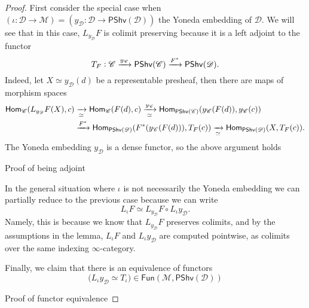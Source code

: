 \documentclass[../text]{subfiles}
\begin{document}
\begin{proof}
    First consider the special case when $(\iota: \mathscr{D} \xrightarrow{} \mathscr{M}) = (y_{\mathscr{D}}: \mathscr{D} \xrightarrow{} \mathsf{PShv}(\mathscr{D}))$ the Yoneda embedding of $\mathscr{D}$. We will see that in this case, $L_{y_{\mathscr{D}}} F$ is colimit preserving because it is a left adjoint to the functor
    \begin{equation}
        T_F: \mathscr{C} \xrightarrow{y_{\mathscr{C}}} \mathsf{PShv} (\mathscr{C}) \xrightarrow{F^*} \mathsf{PShv} (\mathscr{D}).
    \end{equation}
    Indeed, let $X \simeq y_{\mathscr{D}} (d)$ be a representable presheaf, then there are maps of morphism spaces
    \begin{align}
        \mathsf{Hom}_{\mathscr{C}} (L_{y_{\mathscr{D}}} F (X), c) &\xrightarrow[\simeq]{} \mathsf{Hom}_{\mathscr{C}} (F (d), c) \xrightarrow[\simeq]{y_{\mathscr{C}}} \mathsf{Hom}_{\mathsf{PShv}(\mathscr{C})} (y_{\mathscr{C}}(F(d)), y_{\mathscr{C}}(c))\notag\\ &\xrightarrow{F^*} \mathsf{Hom}_{\mathsf{PShv}(\mathscr{D})} (F^*(y_{\mathscr{C}}(F(d))), T_F(c)) \xrightarrow[\simeq]{} \mathsf{Hom}_{\mathsf{PShv}(\mathscr{D})} (X, T_F(c)).
    \end{align}
    The Yoneda embedding $y_{\mathscr{D}}$ is a dense functor, so the above argument holds  
    
    {\color{red} Proof of being adjoint}

    In the general situation where $\iota$ is not necessarily the Yoneda embedding we can partially reduce to the previous case because we can write
    \begin{equation}
        L_{\iota} F \simeq L_{y_{\mathscr{D}}}F \circ L_{\iota} y_{\mathscr{D}}.
    \end{equation}
    Namely, this is because we know that $L_{y_{\mathscr{D}}} F$ preserves colimits, and by the assumptions in the lemma, $L_{\iota} F$ and $L_{\iota} y_{\mathscr{D}}$ are computed pointwise, as colimits over the same indexing $\infty$-category.

    Finally, we claim that there is an equivalence of functors
    \begin{equation}
        \Big( L_{\iota} y_{\mathscr{D}} \simeq T_{\iota} \Big) \in \mathsf{Fun}(\mathscr{M}, \mathsf{PShv}(\mathscr{D})) 
    \end{equation}

    {\color{red} Proof of functor equivalence}
    
\end{proof}
\end{document}
